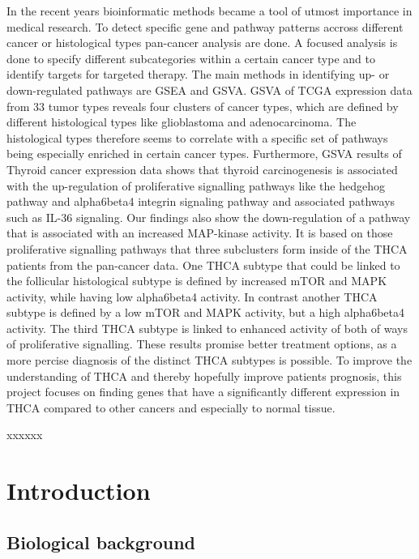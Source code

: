 \documentclass[
  parskip,
  oneside]{scrreprt}
\begin{document}
In the recent years bioinformatic methods became a tool of utmost
importance in medical research. To detect specific gene and pathway
patterns accross different cancer or histological types pan-cancer
analysis are done. A focused analysis is done to specify different
subcategories within a certain cancer type and to identify targets for
targeted therapy. The main methods in identifying up- or down-regulated
pathways are GSEA and GSVA. GSVA of TCGA expression data from 33 tumor
types reveals four clusters of cancer types, which are defined by
different histological types like glioblastoma and adenocarcinoma. The
histological types therefore seems to correlate with a specific set of
pathways being especially enriched in certain cancer types. Furthermore,
GSVA results of Thyroid cancer expression data shows that thyroid
carcinogenesis is associated with the up-regulation of proliferative
signalling pathways like the hedgehog pathway and alpha6beta4 integrin
signaling pathway and associated pathways such as IL-36 signaling. Our
findings also show the down-regulation of a pathway that is associated
with an increased MAP-kinase activity. It is based on those
proliferative signalling pathways that three subclusters form inside of
the THCA patients from the pan-cancer data. One THCA subtype that could
be linked to the follicular histological subtype is defined by increased
mTOR and MAPK activity, while having low alpha6beta4 activity. In
contrast another THCA subtype is defined by a low mTOR and MAPK
activity, but a high alpha6beta4 activity. The third THCA subtype is
linked to enhanced activity of both of ways of proliferative signalling.
These results promise better treatment options, as a more percise
diagnosis of the distinct THCA subtypes is possible. To improve the
understanding of THCA and thereby hopefully improve patients prognosis,
this project focuses on finding genes that have a significantly
different expression in THCA compared to other cancers and especially to
normal tissue.


xxxxxx

\tableofcontents

\hypertarget{introduction}{%
\chapter{Introduction}\label{introduction}}

\hypertarget{biological-background}{%
\section{Biological background}\label{biological-background}}
\end{document}
